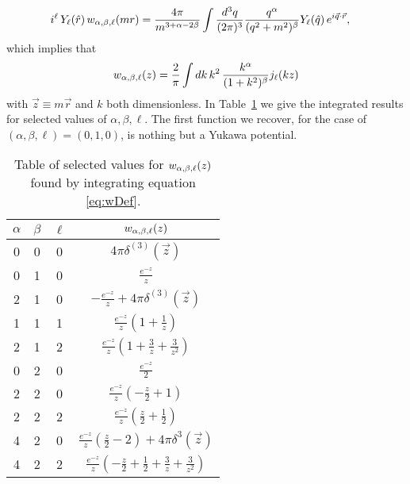 \begin{align}
i^\ell \, Y_\ell(\hat{r}) \, w_{\alpha,\beta,\ell}( m r)  &= \frac{4 \pi}{m^{3+\alpha-2\beta} }  \int \frac{d^3 q}{(2\pi)^3} \frac{q^\alpha}{(q^2+m^2)^\beta} Y_\ell(\hat{q}) \, e^{i \vec{q} \cdot \vec{r}  },
\end{align}
which implies that
\begin{align}\label{eq:wDef}
w_{\alpha,\beta,\ell}(z) =  \frac{2}{\pi} \int dk \, k^2 \, \frac{k^\alpha}{(1+k^2)^\beta} j_\ell(k z)
\end{align}
with $\vec{z} \equiv m \vec{r}$ and $k$ both dimensionless. In Table~\ref{table:wTable} we give the integrated results for selected values of $\alpha, \beta, \ell$. The first function we recover, for the case of $(\alpha, \beta, \ell ) = (0,1,0)$, is nothing but a Yukawa potential.

\begin{table}
\begin{center}
\renewcommand*{\arraystretch}{1.5}
\begin{tabular}{| c c c | c |}
\hline
$\alpha$ & $\beta$ & $\ell$ & $ w_{\alpha,\beta,\ell}(z)$ \\
\hline
0 & 0 & 0 & $ 4\pi \delta^{(3)}(\vec{z}) $ \\
0 & 1 & 0 & $ \frac{\displaystyle e^{-z}}{\displaystyle z} $ \\
2 & 1 & 0 & $ -\frac{\displaystyle e^{-z}}{\displaystyle z} + 4\pi \delta^{(3)}(\vec{z}) $ \\
1 & 1 & 1 &  $\frac{\displaystyle e^{-z}}{\displaystyle z} (1 + \tfrac{1}{z})  $ \\
2 & 1 & 2 & $ \frac{\displaystyle e^{-z}}{\displaystyle z} (1+ \tfrac{3}{z} + \tfrac{3}{z^2} )$ \\
0 & 2 & 0 & $ \frac{\displaystyle e^{-z}}{2} $ \\
2 & 2 & 0 & $ \frac{\displaystyle e^{-z}}{\displaystyle z} (-\tfrac{z}{2} + 1 ) $ \\
2 & 2 & 2 & $  \frac{\displaystyle e^{-z}}{\displaystyle z} (\tfrac{z}{2} + \tfrac{1}{2} ) $ \\
4 & 2 & 0 & $  \frac{\displaystyle e^{-z}}{\displaystyle z} (\tfrac{z}{2} - 2 ) + 4 \pi \delta^3( \vec{z} )  $ \\
4 & 2 & 2 & $  \frac{\displaystyle e^{-z}}{\displaystyle z} ( - \tfrac{z}{2} + \tfrac{1}{2} + \tfrac{3}{z} + \tfrac{3}{z^2} ) $ \\
\hline
\end{tabular}
\end{center}
\caption[Selected expressions for the scalar functions $\w{\alpha}{\beta}{l}{z}$]{\label{table:wTable}Table of selected values for $w_{\alpha,\beta,\ell}(z)$ found by integrating equation \eqref{eq:wDef}.}
\end{table}

